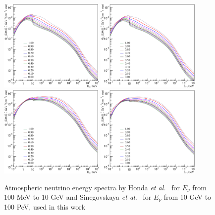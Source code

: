 \begin{figure}[htb!]
\begin{center}
\includegraphics[width=0.45\textwidth]{./AN/HGm_KM_ne_spectra.eps}
\includegraphics[width=0.45\textwidth]{./AN/HGm_KM_ae_spectra.eps}
\includegraphics[width=0.45\textwidth]{./AN/HGm_KM_nm_spectra.eps}
\includegraphics[width=0.45\textwidth]{./AN/HGm_KM_am_spectra.eps}
\caption{\label{ANspectra}Atmospheric neutrino energy spectra by Honda \textit{et al.}~\cite{Honda:2011nf} for $E_{\nu}$ from 100 MeV to 10 GeV and Sinegovskaya \textit{et al.}~\cite{Sinegovskaya:2014pia} for $E_{\nu}$ from 10 GeV to 100 PeV, used in this work}
\end{center}
\end{figure}

